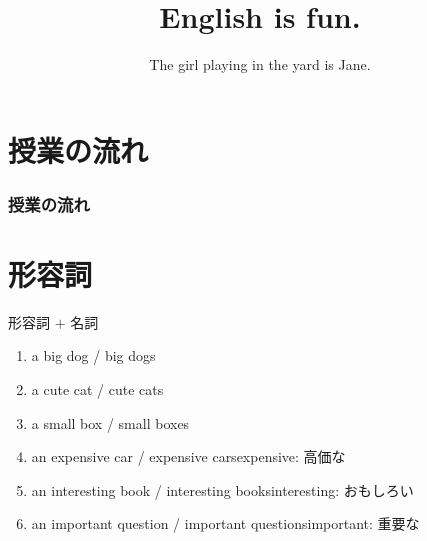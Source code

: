 \documentclass[aspectratio=169,xcolor={dvipsnames,table}]{beamer}
\title{English is fun.}
\subtitle{The girl playing in the yard is Jane.}
\author{}
\institute[]{}
\date[]
\begin{document}
\begin{frame}[plain]
  \titlepage
\end{frame}

\section*{授業の流れ}
\begin{frame}[plain]
  \frametitle{授業の流れ}
  \tableofcontents
\end{frame}

\section{}
\subsection{}
\section{形容詞}
 \begin{frame}[plain]{形容詞 $+$ 名詞}
 \begin{enumerate}
  \item a big dog / big dogs
  \item a cute cat / cute cats
  \item a small box / small boxes
  \item an expensive car / expensive cars\hfill{\scriptsize expensive: 高価な}
  \item an interesting book / interesting books\hfill{\scriptsize interesting: おもしろい}
  \item an important question / important questions\hfill{\scriptsize important: 重要な}
 \end{enumerate}

\mbox{}\hfill{\scriptsize {}}
 \end{frame}
\end{document}
